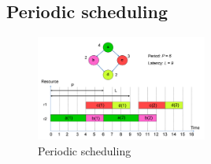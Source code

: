 \subsection{Periodic scheduling}

\begin{figure}
	\begin{center}
		\includegraphics[width=0.5\textwidth]{images/Periodic_scheduling.png}
		\caption{Periodic scheduling}
		\label{fig:periodic_scheduling}
	\end{center}
\end{figure}






